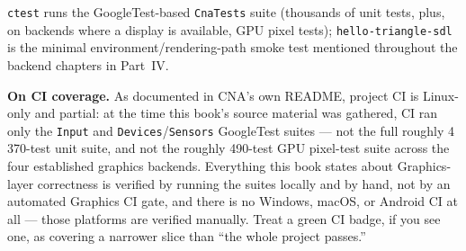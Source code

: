 \texttt{ctest} runs the GoogleTest-based \texttt{CnaTests} suite (thousands of unit tests,
plus, on backends where a display is available, GPU pixel tests); \texttt{hello-triangle-sdl}
is the minimal environment/rendering-path smoke test mentioned throughout the backend chapters
in Part~IV.

\begin{sourcenote}
\textbf{On CI coverage.} As documented in CNA's own README, project CI is Linux-only and
partial: at the time this book's source material was gathered, CI ran only the
\texttt{Input} and \texttt{Devices}/\texttt{Sensors} GoogleTest suites --- not the full
roughly 4\,370-test unit suite, and not the roughly 490-test GPU pixel-test suite across the
four established graphics backends. Everything this book states about Graphics-layer
correctness is verified by running the suites locally and by hand, not by an automated
Graphics CI gate, and there is no Windows, macOS, or Android CI at all --- those platforms
are verified manually. Treat a green CI badge, if you see one, as covering a narrower slice
than ``the whole project passes.''
\end{sourcenote}
